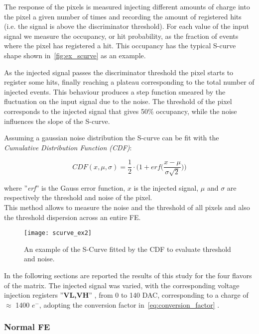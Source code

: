 The response of the pixels is measured injecting different amounts of charge into the pixel a given number of times and recording the amount of registered hits (i.e. the signal is above the discriminator threshold). For each value of the input signal we measure the occupancy, or hit probability, as the fraction of events where the pixel has registered a hit. This occupancy has the typical S-curve shape shown in~\autoref{fig:ex_scurve} as an example. 

As the injected signal passes the discriminator threshold the pixel starts to register some hits, finally reaching a plateau corresponding to the total number of injected events. This behaviour produces a step function smeared by the fluctuation on the input signal due to the noise.  
The threshold of the pixel corresponds to the injected signal  that gives 50\% occupancy, while the noise influences the slope of the S-curve.  

Assuming a gaussian noise distribution the S-curve can be fit with the \textit{Cumulative Distribution Function (CDF)}:

\begin{equation}
 CDF(x,\mu,\sigma) = \frac{1}{2} \cdot \bigg(1 + \textit{erf}\bigg(\frac{x-\mu}{\sigma \sqrt{2}}\bigg)\bigg)
\label{eq:s-curve}
\end{equation}

where ''\textit{erf}'' is the Gauss error function, $x$ is the injected signal, $\mu$ and $\sigma$ are respectively the threshold and noise of the pixel.  \\

This method allows to measure the noise and the threshold of all pixels and also the threshold dispersion across an entire FE.

\begin{figure}
\centering
\texttt{[image: scurve\_ex2]}
\caption{An example of the S-Curve fitted by the CDF to evaluate threshold and noise.}
\label{fig:ex_scurve}
\end{figure}

In the following sections are reported the results of this study for the four flavors of the matrix. The injected signal was varied, with the corresponding voltage injection registers ''\textbf{VL,VH}'' , from 0 to 140 DAC, corresponding to a charge of $\approx$ 1400 $e^{-}$, adopting the conversion factor in~\autoref{eq:conversion_factor} .


\subsubsection{Normal FE}


